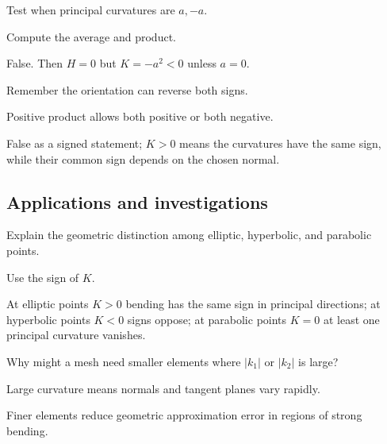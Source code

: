 \begin{exercise}[\(H=0\) means \(K=0\)]\label{exr:vii17-ped-11}
Test when principal curvatures are \(a,-a\).
\end{exercise}
\begin{hint}
Compute the average and product.
\end{hint}
\begin{solution}
False.  Then \(H=0\) but \(K=-a^2<0\) unless \(a=0\).
\end{solution}

\begin{exercise}\label{exr:vii17-ped-12}
Remember the orientation can reverse both signs.
\end{exercise}
\begin{hint}
Positive product allows both positive or both negative.
\end{hint}
\begin{solution}
False as a signed statement; \(K>0\) means the curvatures have the same sign, while their common sign depends on the chosen normal.
\end{solution}

\subsection*{Applications and investigations}

\begin{exercise}\label{exr:vii17-ped-13}
Explain the geometric distinction among elliptic, hyperbolic, and parabolic points.
\end{exercise}
\begin{hint}
Use the sign of \(K\).
\end{hint}
\begin{solution}
At elliptic points \(K>0\) bending has the same sign in principal directions; at hyperbolic points \(K<0\) signs oppose; at parabolic points \(K=0\) at least one principal curvature vanishes.
\end{solution}

\begin{exercise}\label{exr:vii17-ped-14}
Why might a mesh need smaller elements where \(|k_1|\) or \(|k_2|\) is large?
\end{exercise}
\begin{hint}
Large curvature means normals and tangent planes vary rapidly.
\end{hint}
\begin{solution}
Finer elements reduce geometric approximation error in regions of strong bending.
\end{solution}

